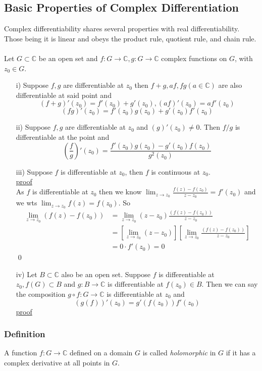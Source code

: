 \documentclass[a4paper, 12pt, twoside]{article}
\begin{document}
            \subsection{Basic Properties of Complex Differentiation}
                Complex differentiability shares several properties with real differentiability. Those being it is linear and obeys the product rule, quotient rule, and chain rule.\\\\
                Let $G\subset \mathbb{C}$ be an open set and $f:G \to  \mathbb{C}, g:G \to  \mathbb{C}$ complex functions on $G$, with $z_{0}\in G$.
                \begin{itemize}
                    \item[i)]  Suppose $f,g$ are differentiable at $z_{0}$ then  $f+g,af,fg (a\in \mathbb{C})$ are also differentiable at said point and
                    \noindent
                    $$(f+g)'(z_{0})=f'(z_{0})+g'(z_{0}), (af)'(z_{0})=af'(z_{0}) $$
                    $$(fg)'(z_{0})= f'(z_{0})g(z_{0})+g'(z_{0})f'(z_{0}) $$
                    \item[ii)]  Suppose $f,g$ are differentiable at $z_{0}$ and $(g)'(z_{0})\neq 0$. Then $f/g$ is differentiable at the point and
                    $$(\frac{f}{g})'(z_{0})=\frac{f'(z_{0})g(z_{0})-g'(z_{0})f(z_{0})}{g^{2}(z_{0})} $$
                    \item[iii)] Suppose $f$ is differentiable at $z_{0}$, then $f$ is continuous at $z_{0}$.\\
                    \underline{proof}\\
                    As $f$ is differentiable at $z_{0}$ then we know $\lim_{z\to z_{0}}\frac{f(z)-f(z_{0})}{z-z_{0}}=f'(z_{0}) $ and we wts $ \lim_{z\to z_{0}}f(z)=f(z_{0})$. So
                    \begin{align*}
                         \lim_{z\to z_{0}}(f(z)-f(z_{0})) &=  \lim_{z\to z_{0}}(z-z_{0})\frac{(f(z)-f(z_{0}))}{z-z_{0}}\\
                         &=[\lim_{z\to z_{0}}(z-z_{0})][\lim_{z\to z_{0}}\frac{(f(z)-f(z_{0}))}{z-z_{0}}]\\
                         &= 0\cdot f'(z_{0}) =0
                    \end{align*}\qed
                    \item[iv)] Let $B\subset \mathbb{C}$ also be an open set. Suppose $f$ is differentiable at $z_{0},f(G)\subset B$ and $g:B\to \mathbb{C}$ is differentiable at $f(z_{0})\in B$. Then we can say the composition $g\circ f:G\to \mathbb{C}$ is differentiable at $z_{0}$ and
                    $$(g(f))'(z_{0})=g'(f(z_{0}))f'(z_{0}) $$
                    \underline{proof}\\

                    
                \end{itemize}
                \subsubsection{Definition}
                    A function $f:G \to  \mathbb{C}$ defined on a domain $G$ is called \emph{holomorphic} in $G$ if it has a complex derivative at all points in $G$.
\end{document}
